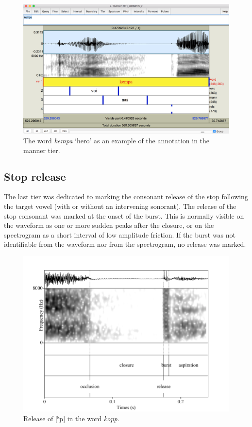 \documentclass[11pt,a4paper,openany]{memoir}\usepackage[]{graphicx}\usepackage[]{color}
\begin{document}
\begin{figure}
\centering
\includegraphics[width=\textwidth]{mann}
\caption{The word \textit{kempa} `hero' as an example of the annotation in the manner tier.}
\label{f:mann}
\end{figure}

\subsection{Stop release}
The last tier was dedicated to marking the consonant release of the stop following the target vowel (with or without an intervening sonorant).
The release of the stop consonant was marked at the onset of the burst.
This is normally visible on the waveform as one or more sudden peaks after the closure, or on the spectrogram as a short interval of low amplitude friction.
If the burst was not identifiable from the waveform nor from the spectrogram, no release was marked.

\begin{figure}
\centering
\includegraphics[width=\textwidth]{kopp}
\caption{Release of [ʰp] in the word \textit{kopp}.}
\label{f:release}
\end{figure}
\end{document}
